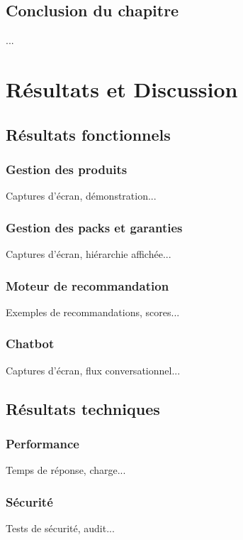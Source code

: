 \documentclass[12pt,a4paper]{report}
\begin{document}
\section{Conclusion du chapitre}
...

\chapter{Résultats et Discussion}
\label{chap:resultats}

\section{Résultats fonctionnels}
\subsection{Gestion des produits}
Captures d'écran, démonstration...

\subsection{Gestion des packs et garanties}
Captures d'écran, hiérarchie affichée...

\subsection{Moteur de recommandation}
Exemples de recommandations, scores...

\subsection{Chatbot}
Captures d'écran, flux conversationnel...

\section{Résultats techniques}
\subsection{Performance}
Temps de réponse, charge...

\subsection{Sécurité}
Tests de sécurité, audit...
\end{document}
